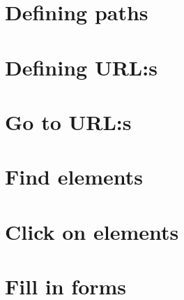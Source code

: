 \documentclass[a4paper,11pt]{kth-mag}
\begin{document}
\section{Defining paths}

\section{Defining URL:s}

\section{Go to URL:s}



\section{Find elements}









\section{Click on elements}


\section{Fill in forms}





\end{document}
